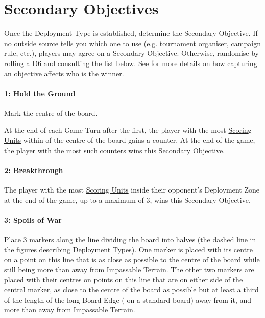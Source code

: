 \newpage
\section{Secondary Objectives}
\label{secondary_objectives}

Once the Deployment Type is established, determine the Secondary Objective. If no outside source tells you which one to use (e.g. tournament organiser, campaign rule, etc.), players may agree on a Secondary Objective. Otherwise, randomise by rolling a D6 and consulting the list below. See  for more details on how capturing an objective affects who is the winner.

\paragraph{1: Hold the Ground}

\newline
Mark the centre of the board.

At the end of each Game Turn after the first, the player with the most \hyperref[scoring]{Scoring Units} within  of the centre of the board gains a counter. At the end of the game, the player with the most such counters wins this Secondary Objective.

\paragraph{2: Breakthrough}

\newline
The player with the most \hyperref[scoring]{Scoring Units} inside their opponent's Deployment Zone at the end of the game, up to a maximum of 3, wins this Secondary Objective.

\paragraph{3: Spoils of War}

\newline
Place 3 markers along the line dividing the board into halves (the dashed line in the figures describing Deployment Types). One marker is placed with its centre on a point on this line that is as close as possible to the centre of the board while still being more than  away from Impassable Terrain. The other two markers are placed with their centres on points on this line that are on either side of the central marker, as close to the centre of the board as possible but at least a third of the length of the long Board Edge ( on a standard board) away from it, and more than  away from Impassable Terrain.

